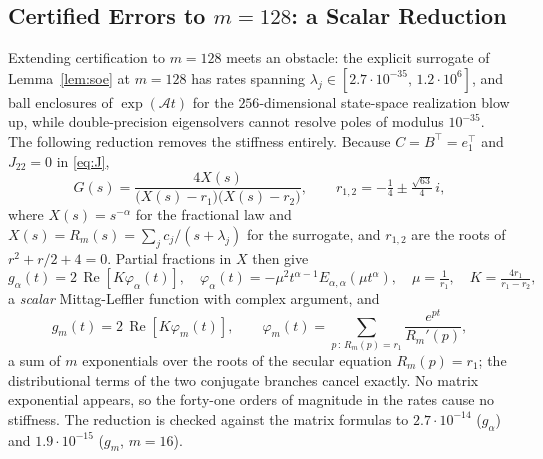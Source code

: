 \documentclass[mathematics,article,accept,pdftex,moreauthors]{Definitions/mdpi}
\DeclareMathOperator{\Real}{Re}
\begin{document}
\subsection{Certified Errors to \boldmath$m=128$: a Scalar Reduction}
\label{sec:reduction}

Extending certification to $m=128$ meets an obstacle: the explicit surrogate of Lemma~\ref{lem:soe} at $m=128$ has rates spanning $\lambda_{j}\in[2.7\cdot10^{-35},\,1.2\cdot10^{6}]$, and ball enclosures of $\exp(\mathcal{A}t)$ for the $256$-dimensional state-space realization blow up, while double-precision eigensolvers cannot resolve poles of modulus $10^{-35}$. The following reduction removes the stiffness entirely. Because $C=B^{\top}=e_{1}^{\top}$ and $J_{22}=0$ in \eqref{eq:J},
\begin{equation}
G(s)=\frac{4X(s)}{\bigl(X(s)-r_{1}\bigr)\bigl(X(s)-r_{2}\bigr)},\qquad r_{1,2}=-\tfrac14\pm\tfrac{\sqrt{63}}4\,i,
\label{eq:reduction}
\end{equation}
where $X(s)=s^{-\alpha}$ for the fractional law and $X(s)=R_{m}(s)=\sum_{j}c_{j}/(s+\lambda_{j})$ for the surrogate, and $r_{1,2}$ are the roots of $r^{2}+r/2+4=0$. Partial fractions in $X$ then give
\begin{equation}
g_{\alpha}(t)=2\,\Real\!\left[K\varphi_{\alpha}(t)\right],\quad
\varphi_{\alpha}(t)=-\mu^{2}t^{\alpha-1}E_{\alpha,\alpha}(\mu t^{\alpha}),\quad \mu=\tfrac1{r_{1}},\quad K=\tfrac{4r_{1}}{r_{1}-r_{2}},
\label{eq:galpha}
\end{equation}
a \emph{scalar} Mittag-Leffler function with complex argument, and
\begin{equation}
g_{m}(t)=2\,\Real\!\left[K\varphi_{m}(t)\right],\qquad
\varphi_{m}(t)=\sum_{p\,:\,R_{m}(p)=r_{1}}\frac{e^{pt}}{R_{m}'(p)},
\label{eq:gm}
\end{equation}
a sum of $m$ exponentials over the roots of the secular equation $R_{m}(p)=r_{1}$; the distributional terms of the two conjugate branches cancel exactly. No matrix exponential appears, so the forty-one orders of magnitude in the rates cause no stiffness. The reduction is checked against the matrix formulas to $2.7\cdot10^{-14}$ ($g_{\alpha}$) and $1.9\cdot10^{-15}$ ($g_{m}$, $m=16$).
\end{document}

